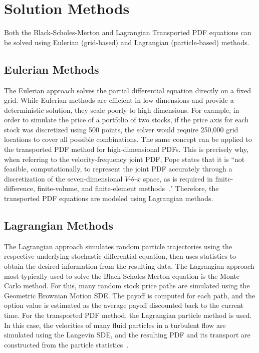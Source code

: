 \documentclass[12pt, onecolumn, journal]{IEEEtran}
\begin{document}
\section{Solution Methods}
\label{sec:solution_methods}

Both the Black-Scholes-Merton and Lagrangian Transported PDF equations can be solved using Eulerian (grid-based) and Lagrangian (particle-based) methods.

\subsection{Eulerian Methods}
The Eulerian approach solves the partial differential equation directly on a fixed grid. While Eulerian methods are efficient in low dimensions and provide a deterministic solution, they scale poorly to high dimensions. For example, in order to simulate the price of a portfolio of two stocks, if the price axis for each stock was discretized using 500 points, the solver would require 250,000 grid locations to cover all possible combinations. The same concept can be applied to the transported PDF method for high-dimensional PDFs. This is precisely why, when referring to the velocity-frequency joint PDF, Pope states that it is ``not feasible, computationally, to represent the joint PDF accurately through a discretization of the seven-dimensional $V$-$\theta$-$x$ space, as is required in finite-difference, finite-volume, and finite-element methods~\cite{Pope2000}." Therefore, the transported PDF equations are modeled using Lagrangian methods.

\subsection{Lagrangian Methods}
The Lagrangian approach simulates random particle trajectories using the respective underlying stochastic differential equation, then uses statistics to obtain the desired information from the resulting data. The Lagrangian approach most typically used to solve the Black-Scholes-Merton equation is the Monte Carlo method. For this, many random stock price paths are simulated using the Geometric Brownian Motion SDE. The payoff is computed for each path, and the option value is estimated as the average payoff discounted back to the current time. For the transported PDF method, the Lagrangian particle method is used. In this case, the velocities of many fluid particles in a turbulent flow are simulated using the Langevin SDE, and the resulting PDF and its transport are constructed from the particle statistics~\cite{Pope2000}.
\end{document}
